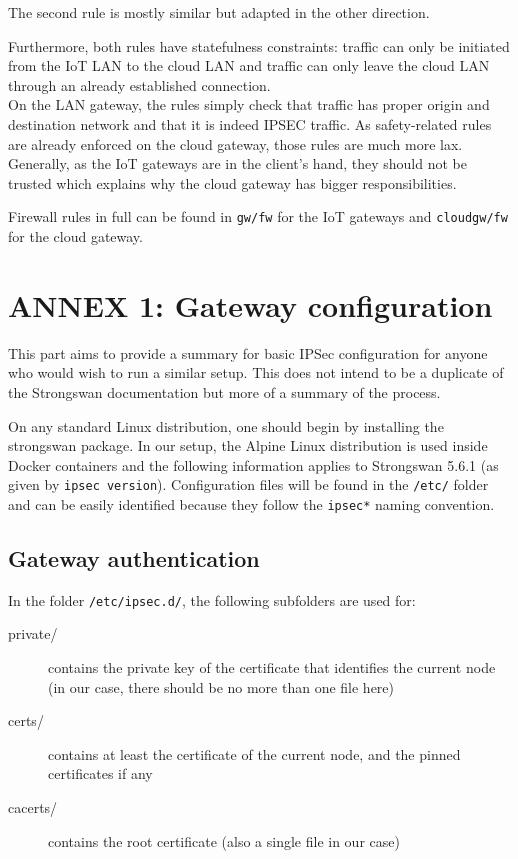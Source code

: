 \documentclass[paper=a4, fontsize=11pt]{scrartcl}
\begin{document}
The second rule is mostly similar but adapted in the other direction.

Furthermore, both rules have statefulness constraints: traffic can only be
initiated from the IoT LAN to the cloud LAN and traffic can only leave the cloud
LAN through an already established connection.
\\

On the LAN gateway, the rules simply check that traffic has proper origin and
destination network and that it is indeed IPSEC traffic.
As safety-related rules are already enforced on the cloud gateway, those rules
are much more lax.
Generally, as the IoT gateways are in the client's hand, they should not be
trusted which explains why the cloud gateway has bigger responsibilities.

Firewall rules in full can be found in \texttt{gw/fw} for the IoT gateways and
\texttt{cloudgw/fw} for the cloud gateway.

\newpage{}

\section{ANNEX 1: Gateway configuration}\label{gwcfg}

This part aims to provide a summary for basic IPSec configuration for anyone
who would wish to run a similar setup.
This does not intend to be a duplicate of the Strongswan documentation but more
of a summary of the process.

On any standard Linux distribution, one should begin by installing the
strongswan package.
In our setup, the Alpine Linux distribution is used inside Docker containers and
the following information applies to Strongswan 5.6.1 (as given by \texttt{ipsec
version}).
Configuration files will be found in the \texttt{/etc/} folder and can be easily
identified because they follow the \texttt{ipsec*} naming convention.

\subsection{Gateway authentication}

In the folder \texttt{/etc/ipsec.d/}, the following subfolders are used for:
\begin{description}
    \item [private/] contains the private key of the certificate that identifies
        the current node (in our case, there should be no more than one file
        here)
    \item [certs/] contains at least the certificate of the current node, and the
        pinned certificates if any
    \item [cacerts/] contains the root certificate (also a single file in our
        case)
\end{description}
\end{document}
